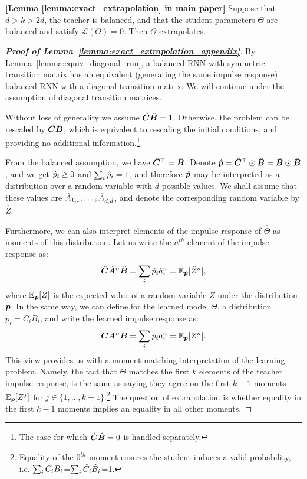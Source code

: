 \begin{lemma}\textbf{[Lemma \ref{lemma:exact_extrapolation} in main paper]} 
\label{lemma:exact_extrapolation_appendix}
Suppose that $d > k > 2\hat{d}$, the teacher is balanced, and that the student parameters $\Theta$ are balanced and satisfy $\mathcal{L} ( \Theta ) = 0$. Then $\Theta$ extrapolates.
\end{lemma}
\begin{proof}[\textbf{Proof of Lemma~\ref{lemma:exact_extrapolation_appendix}}]
By Lemma~\ref{lemma:equiv_diagonal_rnn}, a balanced RNN with symmetric transition matrix has an equivalent (generating the same impulse response) balanced RNN with a diagonal transition matrix. We will continue under the assumption of diagonal transition matrices. 

Without loss of generality we assume $\hat{{\bm{C}}}\hat{{\bm{B}}}=1$. Otherwise, the problem can be rescaled by $\hat{{\bm{C}}}\hat{{\bm{B}}}$, which is equivalent to rescaling the initial conditions, and providing no additional information.\footnote{The case for which $\hat{{\bm{C}}}\hat{{\bm{B}}}=0$ is handled separately.}

From the balanced assumption, we have $\hat{{\bm{C}}}^\top=\hat{{\bm{B}}}$. Denote $\hat{{\bm{p}}} = \hat{{\bm{C}}}^\top \odot \hat{{\bm{B}}}=\hat{{\bm{B}}}\odot \hat{{\bm{B}}}$, and we get $\hat{{p}}_i\geq 0$ and $\sum_i \hat{{p}}_i=1$,  and therefore $\hat{{\bm{p}}}$ may be interpreted as a distribution over a random variable with $\hat{d}$ possible values. We shall assume that these values are $\hat{{A}}_{1,1},\ldots,\hat{{A}}_{\hat{d},\hat{d}}$, and denote the corresponding random variable by $\hat{Z}$.

Furthermore, we can also interpret elements of the impulse response of $\hat{\Theta}$ as moments of this distribution.
Let us write the $n^{th}$ element of the impulse response as:
\begin{equation}
\hat{{\bm{C}}} \hat{{\bm{A}}}^n \hat{{\bm{B}}} = \sum_i \hat{{p}}_i \hat{a}_i ^n = \mathbb{E}_{\hat{{\bm{p}}}}[\hat{Z}^n],
\end{equation}
where $\mathbb{E}_{{\bm{p}}}[Z]$ is the expected value of a random variable $Z$ under the distribution ${\bm{p}}$.
In the same way, we can define for the learned model $\Theta$, a distribution $p_i = {C}_i {B}_i$, and write the learned impulse response as:
\begin{equation}
{\bm{C}} {\bm{A}}^n {\bm{B}} = \sum_i {p}_i a_i ^n = \mathbb{E}_{{\bm{p}}}[{Z}^n].
\end{equation}
This view provides us with a moment matching interpretation of the learning problem. Namely, the fact that $\Theta$ matches the first $k$ elements of the teacher impulse response, is the same as saying they agree on the first $k-1$ moments $\mathbb{E}_{{\bm{p}}}[{Z}^j]$ for $j\in\{1,\ldots, k-1\}$.\footnote{Equality of the $0^{th}$ moment ensures the student induces a valid probability, i.e. $\sum_{i}{C}_i{B}_i$=$\sum_{i}\hat{{C}}_i\hat{{B}}_i$=1.} The question of extrapolation is whether equality in the first $k-1$ moments implies an equality in all other moments.



\end{proof}

